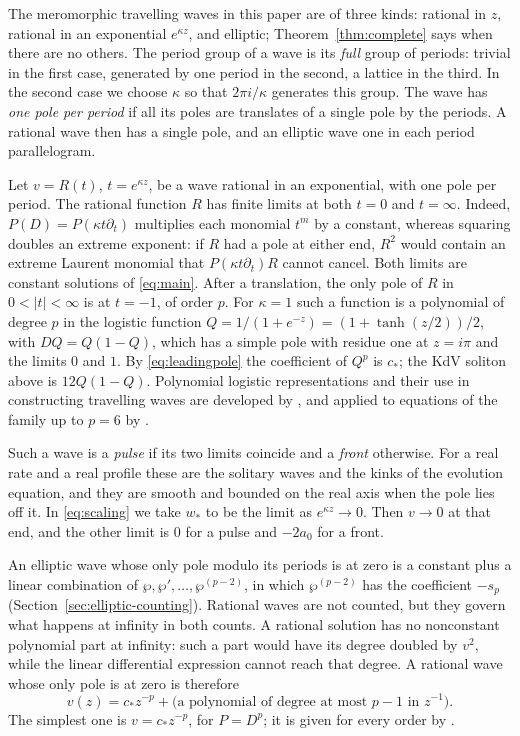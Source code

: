 The meromorphic travelling waves in this paper are of three kinds:
rational in \(z\), rational in an exponential \(e^{\kappa z}\), and
elliptic; Theorem~\ref{thm:complete} says when there are no others. The
period group of a wave is its \emph{full} group of periods: trivial in
the first case, generated by one period in the second, a lattice in the
third. In the second case we choose \(\kappa\) so that
\(2\pi i/\kappa\) generates this group. The wave has \emph{one pole per
period} if all its poles are translates of a single pole by the periods.
A rational wave then has a single pole, and an elliptic wave one in each
period parallelogram.

Let \(v=R(t)\), \(t=e^{\kappa z}\), be a wave rational in an
exponential, with one pole per period. The rational function \(R\) has
finite limits at both \(t=0\) and \(t=\infty\). Indeed,
\(P(D)=P(\kappa t\partial_t)\) multiplies each monomial \(t^m\) by a
constant, whereas squaring doubles an extreme exponent: if \(R\) had a
pole at either end, \(R^2\) would contain an extreme Laurent monomial
that \(P(\kappa t\partial_t)R\) cannot cancel. Both limits are constant
solutions of \eqref{eq:main}. After a translation, the only pole of
\(R\) in \(0<|t|<\infty\) is at \(t=-1\), of order \(p\). For
\(\kappa=1\) such a function is a polynomial of degree \(p\) in the
logistic function \(Q=1/(1+e^{-z})=(1+\tanh(z/2))/2\), with
\(DQ=Q(1-Q)\), which has a simple pole with residue one at \(z=i\pi\)
and the limits \(0\) and \(1\). By \eqref{eq:leadingpole} the
coefficient of \(Q^p\) is \(c_\ast\); the KdV soliton above is
\(12Q(1-Q)\). Polynomial logistic representations and their use in
constructing travelling waves are developed by
\citet{Kudryashov2012,Kudryashov2013,Kudryashov2015}, and applied to
equations of the family up to \(p=6\) by
\citet{RyabovSinelshchikovKochanov2011}.

Such a wave is a \emph{pulse} if its two limits coincide and a
\emph{front} otherwise. For a real rate and a real profile these are the
solitary waves and the kinks of the evolution equation, and they are
smooth and bounded on the real axis when the pole lies off it. In
\eqref{eq:scaling} we take \(w_\ast\) to be the limit as
\(e^{\kappa z}\to0\). Then \(v\to0\) at that end, and the other limit
is \(0\) for a pulse and \(-2a_0\) for a front.

An elliptic wave whose only pole modulo its periods is at zero is a
constant plus a linear combination of \(\wp,\wp',\ldots,\wp^{(p-2)}\),
in which \(\wp^{(p-2)}\) has the coefficient \(-s_p\)
(Section~\ref{sec:elliptic-counting}). Rational waves are not counted,
but they govern what happens at infinity in both counts. A rational
solution has no nonconstant polynomial part at infinity: such a part
would have its degree doubled by \(v^2\), while the linear differential
expression cannot reach that degree. A rational wave whose only pole is
at zero is therefore
\begin{equation}\label{eq:rational-system}
 v(z)=c_\ast z^{-p}+\bigl(\text{a polynomial of degree at most }p-1
 \text{ in }z^{-1}\bigr).
\end{equation}
The simplest one is \(v=c_\ast z^{-p}\), for \(P=D^p\); it is given for
every order by \citet{Kudryashov2004}.

